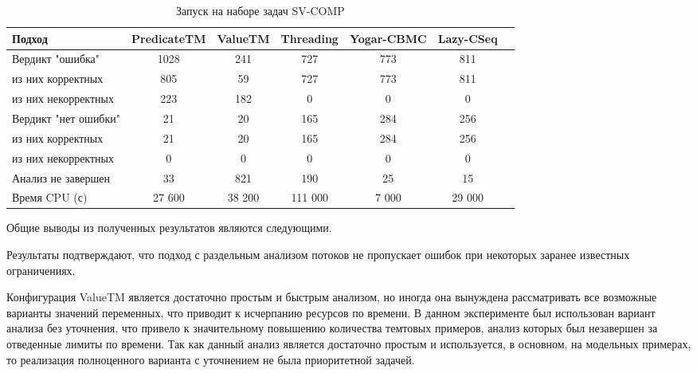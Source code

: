 \begin{center}
  \begin{table}[h]\footnotesize \centering
  	\label{table-sv-comp-tools}
    \caption{Запуск на наборе задач SV-COMP}
    \begin{tabular}{ | l | c | c | c | c | c | c |}
      \hline
      Подход         				& PredicateTM   & ValueTM 	& Threading & Yogar-CBMC 	& Lazy-CSeq  \\ \hline
      Вердикт "ошибка" 				& 1028    		& 241       & 727      	& 773       	& 811       \\ 
  \hspace{0.5cm} из них корректных 	& 805 			& 59 		& 727      	& 773       	& 811       \\ 
  \hspace{0.5cm} из них некорректных & 223 			& 182 		& 0    		& 0       		& 0          \\ \hline
      Вердикт "нет ошибки"  		& 21      		& 20        & 165       & 284        	& 256     \\ 
  \hspace{0.5cm} из них корректных 	& 21 			& 20    	& 165       & 284        	& 256       \\
  \hspace{0.5cm} из них некорректных & 0 			& 0    		& 0       	& 0         	& 0        \\ \hline
      Анализ не завершен       		& 33     		& 821       & 190      	& 25        	& 15      \\ \hline
      Время CPU (с)   				& 27 600 		& 38 200    & 111 000  	& 7 000    		& 29 000    \\ 
      \hline
    \end{tabular}
  \end{table}
\end{center}

Общие выводы из полученных результатов являются следующими.

Результаты подтверждают, что подход с раздельным анализом потоков не пропускает ошибок при некоторых заранее известных ограничениях.

Конфигурация ValueTM является достаточно простым и быстрым анализом, но иногда она вынуждена рассматривать все возможные варианты значений переменных, что приводит к исчерпанию ресурсов по времени.
В данном эксперименте был использован вариант анализа без уточнения, что привело к значительному повышению количества темтовых примеров, анализ которых был незавершен за отведенные лимиты по времени. 
Так как данный анализ является достаточно простым и используется, в основном, на модельных примерах, то реализация полноценного варианта с уточнением не была приоритетной задачей.

